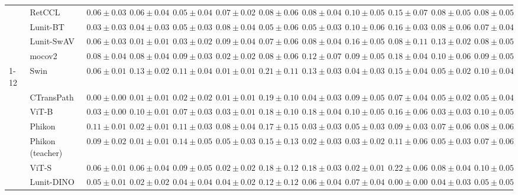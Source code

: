 \begin{tabular}{ll|cccc|c|cccc|c}
 & RetCCL & $0.06 \pm 0.03$ & $0.06 \pm 0.04$ & $0.05 \pm 0.04$ & $0.07 \pm 0.02$ & $0.08 \pm 0.06$ & $0.08 \pm 0.04$ & $0.10 \pm 0.05$ & $0.15 \pm 0.07$ & $0.08 \pm 0.05$ & $0.08 \pm 0.05$ \\
 & Lunit-BT & $0.03 \pm 0.03$ & $0.04 \pm 0.03$ & $0.05 \pm 0.03$ & $0.08 \pm 0.04$ & $0.05 \pm 0.06$ & $0.05 \pm 0.03$ & $0.10 \pm 0.06$ & $0.16 \pm 0.03$ & $0.08 \pm 0.06$ & $0.07 \pm 0.04$ \\
 & Lunit-SwAV & $0.06 \pm 0.03$ & $\mathbf{0.01 \pm 0.01}$ & $0.03 \pm 0.02$ & $0.09 \pm 0.04$ & $0.07 \pm 0.06$ & $0.08 \pm 0.04$ & $0.16 \pm 0.05$ & $0.08 \pm 0.11$ & $0.13 \pm 0.02$ & $0.08 \pm 0.05$ \\
 & mocov2 & $0.08 \pm 0.04$ & $0.08 \pm 0.04$ & $0.09 \pm 0.03$ & $\mathbf{0.02 \pm 0.02}$ & $0.08 \pm 0.06$ & $0.12 \pm 0.07$ & $0.09 \pm 0.05$ & $0.18 \pm 0.04$ & $0.10 \pm 0.06$ & $0.09 \pm 0.05$ \\
\cline{1-12}
\multirow[t]{12}{*}{Mean pool} & Swin & $0.06 \pm 0.01$ & $0.13 \pm 0.02$ & $0.11 \pm 0.04$ & $0.01 \pm 0.01$ & $0.21 \pm 0.11$ & $0.13 \pm 0.03$ & $0.04 \pm 0.03$ & $0.15 \pm 0.04$ & $0.05 \pm 0.02$ & $0.10 \pm 0.04$ \\
 & CTransPath & $\mathbf{0.00 \pm 0.00}$ & $0.01 \pm 0.01$ & $\mathbf{0.02 \pm 0.02}$ & $\mathbf{0.01 \pm 0.01}$ & $0.19 \pm 0.10$ & $0.04 \pm 0.03$ & $0.09 \pm 0.05$ & $0.07 \pm 0.04$ & $0.05 \pm 0.02$ & $0.05 \pm 0.04$ \\
 & ViT-B & $0.03 \pm 0.00$ & $0.10 \pm 0.01$ & $0.07 \pm 0.03$ & $0.03 \pm 0.01$ & $0.18 \pm 0.10$ & $0.18 \pm 0.04$ & $0.10 \pm 0.05$ & $0.16 \pm 0.06$ & $0.03 \pm 0.03$ & $0.10 \pm 0.05$ \\
 & Phikon & $0.11 \pm 0.01$ & $0.02 \pm 0.01$ & $0.11 \pm 0.03$ & $0.08 \pm 0.04$ & $0.17 \pm 0.15$ & $0.03 \pm 0.03$ & $0.05 \pm 0.03$ & $0.09 \pm 0.03$ & $0.07 \pm 0.06$ & $0.08 \pm 0.06$ \\
 & Phikon (teacher) & $0.09 \pm 0.02$ & $\mathbf{0.01 \pm 0.01}$ & $0.14 \pm 0.05$ & $0.05 \pm 0.03$ & $0.15 \pm 0.13$ & $\mathbf{0.02 \pm 0.03}$ & $0.03 \pm 0.02$ & $0.11 \pm 0.06$ & $0.05 \pm 0.03$ & $0.07 \pm 0.06$ \\
 & ViT-S & $0.06 \pm 0.01$ & $0.06 \pm 0.04$ & $0.09 \pm 0.05$ & $0.02 \pm 0.02$ & $0.18 \pm 0.12$ & $0.18 \pm 0.03$ & $\mathbf{0.02 \pm 0.01}$ & $0.22 \pm 0.06$ & $0.08 \pm 0.04$ & $0.10 \pm 0.05$ \\
 & Lunit-DINO & $0.05 \pm 0.01$ & $0.02 \pm 0.02$ & $0.04 \pm 0.04$ & $0.04 \pm 0.02$ & $\mathbf{0.12 \pm 0.12}$ & $0.06 \pm 0.04$ & $0.07 \pm 0.04$ & $\mathbf{0.00 \pm 0.00}$ & $0.04 \pm 0.03$ & $\mathbf{0.05 \pm 0.05}$ \\

\end{tabular}
